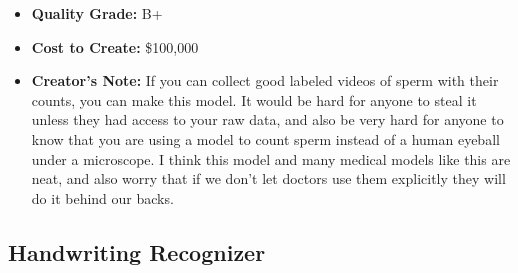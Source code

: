 \begin{itemize}
    \item \textbf{Quality Grade:} B+
    \item \textbf{Cost to Create:} \$100,000
    \item \textbf{Creator's Note:} If you can collect good labeled videos of sperm with their counts, you can make this model. It would be hard for anyone to steal it unless they had access to your raw data, and also be very hard for anyone to know that you are using a model to count sperm instead of a human eyeball under a microscope. I think this model and many medical models like this are neat, and also worry that if we don't let doctors use them explicitly they will do it behind our backs. 
\end{itemize}

\subsection{Handwriting Recognizer}

